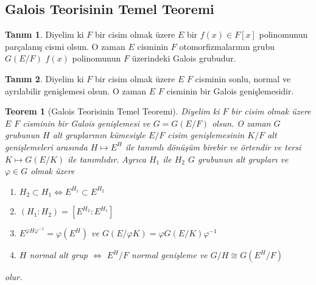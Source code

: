 \documentclass[draft]{article}
\newtheorem{thm}{Teorem}[section]
\theoremstyle{definition}
\newtheorem{defn}{Tanım}[section]
\theoremstyle{remark}
\begin{document}
    	\subsection{Galois Teorisinin Temel Teoremi}
    	
    	    \begin{defn}
    	        Diyelim ki $F$ bir cisim olmak üzere $E$ bir $f(x) \in F[x]$ polinomunun parçalanış cismi olsun. O zaman $E$ cisminin $F$ otomorfizmalarının grubu $G(E/F)$ $f(x)$ polinomunun $F$ üzerindeki Galois grubudur.
    	    \end{defn}
    	    
    	    \begin{defn}
    	        Diyelim ki $F$ bir cisim olmak üzere $E$ $F$ cisminin sonlu, normal ve ayrılabilir genişlemesi olsun. O zaman $E$ $F$ cisminin bir Galois genişlemesidir.
    	    \end{defn}
    	    
    	    \begin{thm}[Galois Teorisinin Temel Teoremi]
    	        Diyelim ki $F$ bir cisim olmak üzere $E$ $F$ cisminin bir Galois genişlemesi ve $G = G(E/F)$ olsun. O zaman $G$ grubunun $H$ alt gruplarının kümesiyle $E/F$ cisim genişlemesinin $K/F$ alt genişlemeleri arasında $H \mapsto E^H$ ile tanımlı dönüşüm birebir ve örtendir ve tersi $K \mapsto G(E/K)$ ile tanımlıdır. Ayrıca $H_1$ ile $H_2$ $G$ grubunun alt grupları ve $\varphi \in G$ olmak üzere
    	        \begin{enumerate}
    				\renewcommand{\labelenumi}{(\roman{enumi})}
    				\item $H_2 \subset H_1 \iff E^{H_1} \subset E^{H_2}$
    				\item $(H_1 : H_2) = [E^{H_2} : E^{H_1}]$
    				\item $E^{\varphi H \varphi^{-1}} = \varphi(E^H)$ ve $G(E/\varphi K) = \varphi G(E/K) \varphi^{-1}$
    				\item $H$ normal alt grup $\iff$ $E^H/F$ normal genişleme ve $G/H \cong G(E^H/F)$
    			\end{enumerate}
    	        olur.
    	    \end{thm}
    	    
\end{document}
